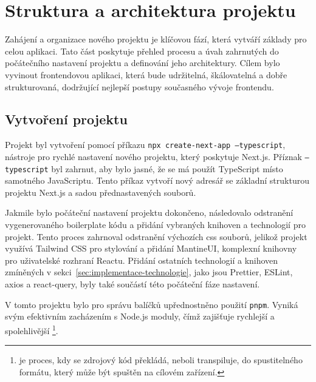 \section{Struktura a architektura projektu}
\label{sec:implementace-architektura}
Zahájení a organizace nového projektu je klíčovou fází, která vytváří základy pro celou aplikaci.
Tato část poskytuje přehled procesu a úvah zahrnutých do počátečního nastavení projektu a definování jeho architektury.
Cílem bylo vyvinout frontendovou aplikaci, která bude udržitelná, škálovatelná a dobře strukturovaná, dodržující nejlepší postupy současného vývoje frontendu.

\subsection{Vytvoření projektu}
\label{subsec:implementace-architektura-vytvoreni-projektu}
Projekt byl vytvoření pomocí příkazu \texttt{npx create-next-app --typescript}, nástroje pro rychlé nastavení nového projektu, který poskytuje Next.js.
Příznak \texttt{--typescript} byl zahrnut, aby bylo jasné, že se má použít TypeScript místo samotného JavaScriptu.
Tento příkaz vytvoří nový adresář se základní strukturou projektu Next.js a sadou přednastavených souborů\cite{n_nextjs_org_docs}.

Jakmile bylo počáteční nastavení projektu dokončeno, následovalo odstranění vygenerovaného boilerplate kódu a přidání vybraných knihoven a technologií pro projekt.
Tento proces zahrnoval odstranění výchozích \ac{css} souborů, jelikož projekt využívá Tailwind CSS pro stylování a přidání MantineUI, komplexní knihovny pro uživatelské rozhraní Reactu.
Přidání ostatních technologií a knihoven zmíněných v sekci~\ref{sec:implementace-technologie}, jako jsou Prettier, ESLint, axios a react-query, byly také součástí této počáteční fáze nastavení.

V tomto projektu bylo pro správu balíčků upřednostněno použití \texttt{pnpm}.
Vyniká svým efektivním zacházením s Node.js moduly, čímž zajišťuje rychlejší a spolehlivější \footnote{ je proces, kdy se zdrojový kód překládá, neboli transpiluje, do spustitelného formátu, který může být spuštěn na cílovém zařízení.}\cite{p__pnpm_io}.

